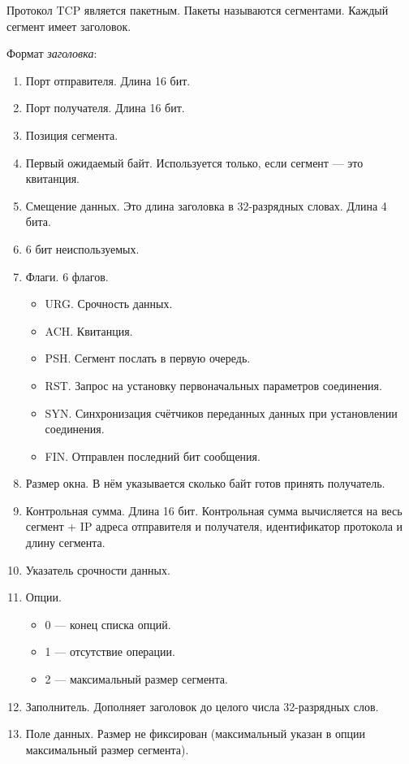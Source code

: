 \documentclass[12pt, russian, oneside, article]{ncc}
\begin{document}
Протокол TCP является пакетным. Пакеты называются сегментами. Каждый сегмент имеет заголовок.

Формат \emph{заголовка}:
\begin{enumerate}
\item Порт отправителя. Длина 16 бит.
\item Порт получателя. Длина 16 бит.
\item Позиция сегмента.
\item Первый ожидаемый байт. Используется только, если сегмент --- это квитанция.
\item Смещение данных. Это длина заголовка в 32-разрядных словах. Длина 4 бита.
\item 6 бит неиспользуемых.
\item Флаги. 6 флагов.

\begin{itemize}
\item URG. Срочность данных.
\item ACH. Квитанция.
\item PSH. Сегмент послать в первую очередь.
\item RST. Запрос на установку первоначальных параметров соединения.
\item SYN. Синхронизация счётчиков переданных данных при установлении соединения.
\item FIN. Отправлен последний бит сообщения.
\end{itemize}

\item Размер окна. В нём указывается сколько байт готов принять получатель.
\item Контрольная сумма. Длина 16 бит. Контрольная сумма вычисляется на весь сегмент + IP адреса отправителя и получателя, идентификатор протокола и длину сегмента.
\item Указатель срочности данных.
\item Опции.

\begin{itemize}
\item 0 --- конец списка опций.
\item 1 --- отсутствие операции.
\item 2 --- максимальный размер сегмента.
\end{itemize}

\item Заполнитель. Дополняет заголовок до целого числа 32-разрядных слов.
\item Поле данных. Размер не фиксирован (максимальный указан в опции максимальный размер сегмента).
\end{enumerate}
\end{document}
